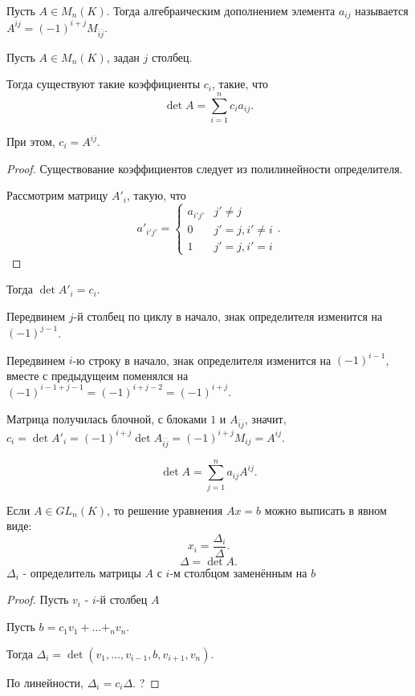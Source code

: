 \begin{definition} \thmslashn 

    Пусть $A\in M_{n}(K)$. Тогда алгебраическим дополнением элемента $a_{ij}$ называется $A^{ij} = (-1)^{i+j}M_{\overline{i}\overline{j}}$.
\end{definition}
\begin{lemma} \thmslashn

    Пусть $A\in M_{n}(K)$, задан $j$ столбец.

    Тогда существуют такие коэффициенты $c_{i}$, такие, что
    \[ \det A = \sum\limits_{i=1}^{n} c_{i}a_{ij} .\]
    
    При этом, $c_{i} = A^{ij}$.
    \begin{proof} \thmslashn
    
        Существование коэффициентов следует из полилинейности определителя.

        Рассмотрим матрицу $A'_{i}$, такую, что 
        \[ a'_{i'j'} = \begin{cases}
            a_{i'j'} & j' \neq j\\
            0 & j' = j, i' \neq i\\
            1 & j' = j, i' = i
        \end{cases} .\]     
    \end{proof}

    Тогда $\det A'_{i} = c_{i}$.

    Передвинем $j$-й столбец по циклу в начало, знак определителя изменится на $(-1)^{j-1}$.

    Передвинем $i$-ю строку в начало, знак определителя изменится на $(-1)^{i-1}$, вместе с предыдущеим поменялся на $(-1)^{i-1+j-1} = (-1)^{i+j-2} = (-1)^{i+j}$.

    Матрица получилась блочной, с блоками $1$ и $A_{\overline{i}\overline{j}}$, значит, $c_{i} = \det A'_{i} = (-1)^{i+j}\det A_{\overline{i}\overline{j}} = (-1)^{i+j}M_{ij} = A^{ij}$.
\end{lemma}
\begin{lemma} \thmslashn

    \[ \det A = \sum\limits_{j=1}^{n} a_{ij}A^{ij} .\] 
\end{lemma}
\begin{lemma} \thmslashn

    Если $A\in GL_{n}(K)$, то решение уравнения $Ax=b$ можно выписать в явном виде:
    \[ x_{i} = \frac{\Delta_{i}}{\Delta} .\]
    \[ \Delta = \det A .\]
    $\Delta_{i}$ - определитель матрицы $A$ с $i$-м столбцом заменённым на $b$
    \begin{proof} \thmslashn
    
        Пусть $v_{i}$ - $i$-й столбец $A$

        Пусть $b = c_1v_1 + \ldots + _{n}v_{n}$.

        Тогда $\Delta_{i} = \det (v_1, \ldots, v_{i-1}, b, v_{i+1}, v_{n})$.

        По линейности, $\Delta_{i} = c_{i}\Delta$. \TODO ?
    \end{proof}
\end{lemma}
